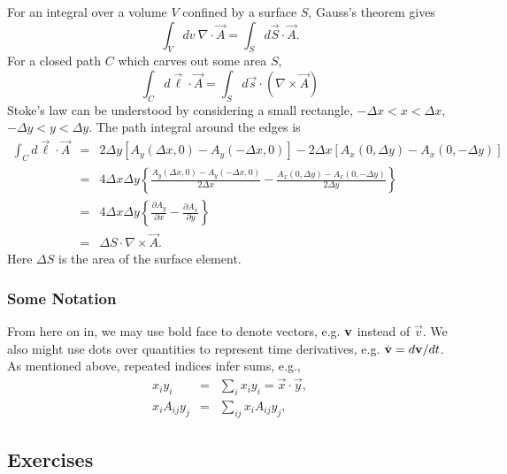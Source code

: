 For an integral over a volume $V$ confined by a surface $S$, Gauss's theorem gives
\[
\int_V dv~\nabla\cdot\vec{A}=\int_Sd\vec{S}\cdot\vec{A}.
\]
For a closed path $C$ which carves out some area $S$, 
\[
\int_C d\vec{\ell}\cdot\vec{A}=\int_Sd\vec{s} \cdot(\nabla\times\vec{A})
\]
Stoke's law can be understood by considering a small rectangle, $-\Delta x<x<\Delta x$, $-\Delta y<y<\Delta y$. The path integral around the edges is
\begin{eqnarray}
\int_C d\vec{\ell}\cdot\vec{A}&=&2\Delta y[A_y(\Delta x,0)-A_y(-\Delta x,0)]-2\Delta x[A_x(0,\Delta y)-A_x(0,-\Delta y)]\\
\nonumber
&=&4\Delta x\Delta y\left\{
\frac{A_y(\Delta x,0)-A_y(-\Delta x,0)}{2\Delta x}-\frac{A_x(0,\Delta y)-A_x(0,-\Delta y)}{2\Delta y}\right\}\\
\nonumber
&=&4\Delta x\Delta y\left\{\frac{\partial A_y}{\partial x}-\frac{\partial A_x}{\partial y}\right\}\\
&=&\Delta S \cdot \nabla\times\vec{A}.
\end{eqnarray}
Here $\Delta S$ is the area of the surface element.

\subsubsection*{Some Notation}
From here on in, we may use bold face to denote vectors, e.g. ${\bf v}$ instead of $\vec{v}$. We also might use dots over quantities to represent time derivatives, e.g. $\dot{\bf v}=d{\bf v}/dt$. As mentioned above, repeated indices infer sums, e.g.,
\begin{eqnarray}
x_iy_i&=&\sum_i x_iy_i=\vec{x}\cdot\vec{y},\\
\nonumber
x_iA_{ij}y_j&=&\sum_{ij}x_iA_{ij}y_j,
\end{eqnarray}


\subsection{Exercises}

